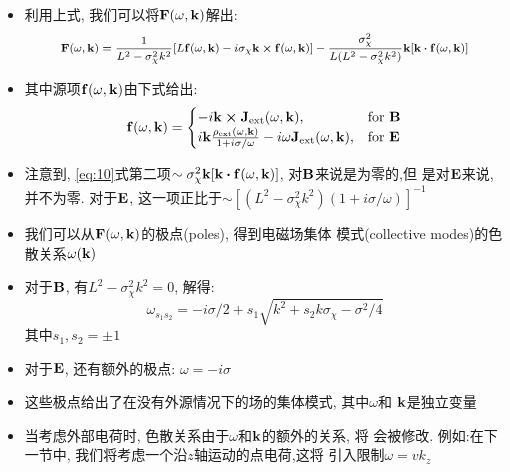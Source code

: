 \documentclass{beamer}
\begin{document}
\begin{frame}
  \begin{itemize}
  \item 利用上式, 我们可以将$\vb{F}(\omega,\vb{k})$解出:
  \begin{equation} \footnotesize \label{eq:10}
    \vb{F}(\omega,\vb{k}) = \frac{1}{L^2-\sigma^2_{\chi}k^2}
    [L\vb{f}(\omega,\vb{k}) - i\sigma_{\chi}\vb{k}\cross \vb{f}(\omega,\vb{k})] -
    \frac{\sigma^2_{\chi}}{L(L^2-\sigma^2_{\chi}k^2)}\vb{k}[\vb{k}\vdot\vb{f}(\omega,\vb{k})]
  \end{equation}
  \item 其中源项$\vb{f}(\omega,\vb{k})$由下式给出:
    \begin{equation}
    \vb{f}(\omega,\vb{k}) =
    \begin{cases}
    -i\vb{k}\cross\vb{J}_{\text{ext}}(\omega,\vb{k}), & \text{for }\vb{B} \\
    i\vb{k}\frac{\rho_{\text{ext}}(\omega,\vb{k})}{1+i\sigma/\omega} - i\omega\vb{J}_{\text{ext}}(\omega,\vb{k}), & \text{for }\vb{E}
    \end{cases}
    \end{equation}
  \item 注意到, \eqref{eq:10}式第二项$\sim \sigma^2_{\chi}
      \vb{k}[\vb{k}\vdot\vb{f}(\omega,\vb{k})]$, 对$\vb{B}$来说是为零的,但
      是对$\vb{E}$来说, 并不为零. 对于$\vb{E}$, 这一项正比于$\sim
      [(L^2-\sigma^2_{\chi}k^2)(1+i\sigma/\omega)]^{-1}$
  \end{itemize}
\end{frame}

\begin{frame}
  \begin{itemize}
    \item 我们可以从$\vb{F}(\omega, \vb{k})$的极点(poles), 得到电磁场集体
        模式(collective modes)的色散关系$\omega(\vb{k})$
    \item 对于$\vb{B}$, 有$L^2 - \sigma^2_{\chi}k^2 = 0$, 解得:
    \begin{equation}
    \omega_{s_1s_2} = -i\sigma/2 + s_1 \sqrt{k^2 + s_2 k \sigma_{\chi} - \sigma^2/4}
    \end{equation}
    其中$s_1, s_2 = \pm 1$
    \item 对于$\vb{E}$, 还有额外的极点: $\omega = -i\sigma$
    \item 这些极点给出了在没有外源情况下的场的集体模式, 其中$\omega$和
        $\vb{k}$是独立变量
    \item 当考虑外部电荷时, 色散关系由于$\omega$和$\vb{k}$的额外的关系, 将
        会被修改. 例如:在下一节中, 我们将考虑一个沿$z$轴运动的点电荷,这将
        引入限制$\omega = vk_z$
  \end{itemize}
\end{frame}
\end{document}
